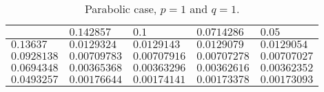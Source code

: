 \begin{table}[!ht]
{        \def\arraystretch{1.25}
        \begin{tabular}{ | C{2cm} || C{2cm} | C{2cm} | C{2cm} | C{2cm} | } %
            \hline
             & $\num{0.142857}$ & $\num{0.1}$ & $\num{0.0714286}$ & $\num{0.05}$ \\
            \hline
            \hline
            $\num{0.13637}$ & $\num{0.0129324}$ & $\num{0.0129143}$ & $\num{0.0129079}$ & $\num{0.0129054}$ \\
            $\num{0.0928138}$ & $\num{0.00709783}$ & $\num{0.00707916}$ & $\num{0.00707278}$ & $\num{0.00707027}$ \\
            $\num{0.0694348}$ & $\num{0.00365368}$ & $\num{0.00363296}$ & $\num{0.00362616}$ & $\num{0.00362352}$ \\
            $\num{0.0493257}$ & $\num{0.00176644}$ & $\num{0.00174141}$ & $\num{0.00173378}$ & $\num{0.00173093}$ \\
            \hline
        \end{tabular}
    }
    \par\bigskip
    \centering
    \caption{Parabolic case, $p = 1$ and $q = 1$.}
\end{table}
\vspace*{\fill}

\newpage


